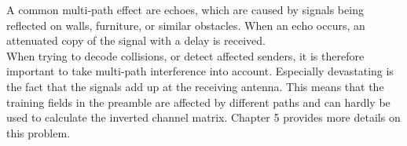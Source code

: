A common multi-path effect are echoes, which are caused by signals being reflected on walls, furniture, or similar obstacles. When an echo occurs, an attenuated copy of the signal with a delay is received.\\

When trying to decode collisions, or detect affected senders, it is therefore important to take multi-path interference into account. Especially devastating is the fact that the signals add up at the receiving antenna. This means that the training fields in the preamble are affected by different paths and can hardly be used to calculate the inverted channel matrix. Chapter 5 provides more details on this problem.
